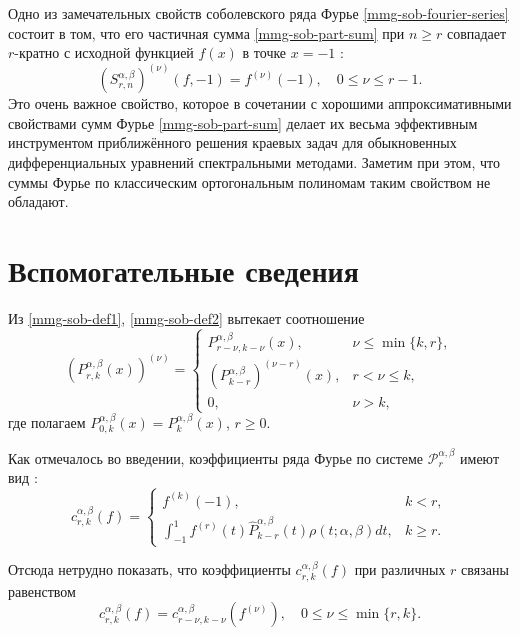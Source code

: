 Одно из замечательных свойств соболевского ряда Фурье \eqref{mmg-sob-fourier-series} состоит в том, что его частичная сумма \eqref{mmg-sob-part-sum} при $n \ge r$ совпадает $r$-кратно с исходной функцией $f(x)$ в точке $x=-1$ \cite[с. 228]{mmg-Shii-izvran2018}:
\begin{equation}\label{mmg-sob-part-sum-coins}
	(S^{\alpha,\beta}_{r,n})^{(\nu)}(f,-1)=f^{(\nu)}(-1), \quad 0\le\nu\le r-1.
\end{equation}
Это очень важное свойство, которое в сочетании с хорошими аппроксимативными свойствами сумм Фурье \eqref{mmg-sob-part-sum}
делает их весьма эффективным инструментом приближённого решения краевых задач для обыкновенных дифференциальных уравнений спектральными методами. Заметим при этом, что суммы Фурье по классическим ортогональным полиномам таким свойством не обладают.

\section{Вспомогательные сведения}
Из \eqref{mmg-sob-def1}, \eqref{mmg-sob-def2} вытекает соотношение
\begin{equation}\label{mmg-Prk-deriv-prop}
	(P^{\alpha,\beta}_{r,k}(x))^{(\nu)} =
	\begin{cases}
		P^{\alpha,\beta}_{r-\nu,k-\nu}(x), &\nu \le \min\{k,r\},\\
		(P^{\alpha,\beta}_{k-r})^{(\nu-r)}(x), &r < \nu \le k,\\
		0, &\nu > k,
	\end{cases}
\end{equation}
где полагаем $P^{\alpha,\beta}_{0,k}(x)=P^{\alpha,\beta}_{k}(x)$, $r \ge 0$.

Как отмечалось во введении, коэффициенты ряда Фурье по системе $\mathcal{P}^{\alpha,\beta}_r$ имеют вид \cite[с. 10]{mmg-SharapudinovIzvRan2019}:
\begin{equation}\label{mmg-crk}
	c^{\alpha,\beta}_{r,k}(f)=
	\begin{cases}
		f^{(k)}(-1), &k < r,\\
		\int_{-1}^1 f^{(r)}(t)\hat{P}_{k-r}^{\alpha,\beta}(t)\rho(t;\alpha,\beta)dt, &k \ge r.
	\end{cases}
\end{equation}

Отсюда нетрудно показать, что коэффициенты $c^{\alpha,\beta}_{r,k}(f)$ при различных $r$ связаны равенством
\begin{equation}\label{mmg-crk-deriv}
	c^{\alpha,\beta}_{r,k}(f)=c^{\alpha,\beta}_{r-\nu,k-\nu}(f^{(\nu)}), \quad 0 \le \nu \le \min\{r,k\}.
\end{equation}

